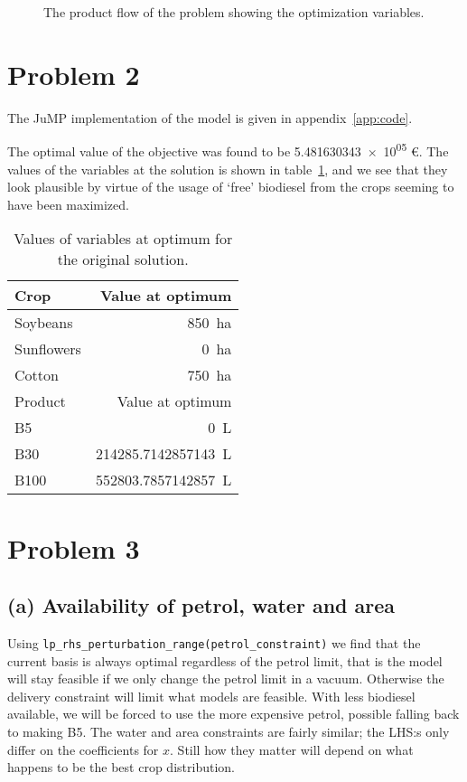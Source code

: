 \documentclass{article}
\begin{document}
\begin{figure}
	\centering
	\def\svgwidth{\textwidth}
	
	\caption{The product flow of the problem showing the optimization variables. \label{fig:productflow}}
\end{figure}

\section{Problem 2}
The JuMP implementation of the model is given in appendix~\ref{app:code}.

The optimal value of the objective was found to be
\num{5.481630343e+05} \euro.
The values of the variables at the solution is shown in table~\ref{tab:optimal_values},
and we see that they look plausible by virtue of the usage of `free' biodiesel
from the crops seeming to have been maximized.

\begin{table}
	\centering
	\caption{Values of variables at optimum for the original solution. \label{tab:optimal_values}}
	\begin{tabular}{l r}
		\toprule
		Crop       & Value at optimum               \\
		\midrule
		Soybeans   & \SI{850}{\hectare}             \\
		Sunflowers & \SI{0}{\hectare}               \\
		Cotton     & \SI{750}{\hectare}             \\
		\bottomrule
		\toprule
		Product    & Value at optimum               \\
		\midrule
		B5         & \SI{0}{\liter}                 \\
		B30        & \SI{214285.7142857143}{\liter} \\
		B100       & \SI{552803.7857142857}{\liter} \\
		\bottomrule
	\end{tabular}
\end{table}

\section{Problem 3}
\subsection{(a) Availability of petrol, water and area}
Using \verb+lp_rhs_perturbation_range(petrol_constraint)+ we find that
the current basis is always optimal regardless of the petrol limit,
that is the model will stay feasible if we only change
the petrol limit in a vacuum.
Otherwise the delivery constraint will limit what models are feasible.
With less biodiesel available,
we will be forced to use the more expensive petrol,
possible falling back to making B5.
The water and area constraints are fairly similar;
the LHS:s only differ on the coefficients for $x$.
Still how they matter will depend on what happens to be
the best crop distribution.
\end{document}
